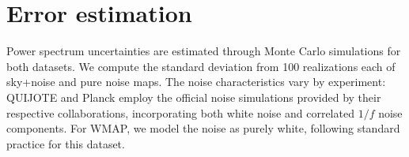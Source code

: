 \section{Error estimation}
\label{sec:error}

Power spectrum uncertainties are estimated through Monte Carlo simulations for both datasets. We compute the standard deviation from 100 realizations each of sky+noise and pure noise maps. The noise characteristics vary by experiment: QUIJOTE and Planck employ the official noise simulations provided by their respective collaborations, incorporating both white noise and correlated $1/f$ noise components. For WMAP, we model the noise as purely white, following standard practice for this dataset.
